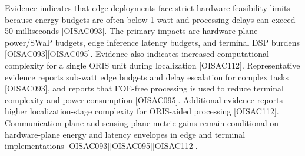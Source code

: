 {}
\markdownRendererSectionEnd \markdownRendererSectionBegin
{}\markdownRendererInterblockSeparator
{}\markdownRendererOlBegin
{} Evidence indicates that edge deployments face strict hardware feasibility limits because energy budgets are often below 1 watt and processing delays can exceed 50 milliseconds [O\markdownRendererUnderscore{}ISAC\markdownRendererUnderscore{}093].\markdownRendererOlItemEnd 
{} The primary impacts are hardware-plane power/SWaP budgets, edge inference latency budgets, and terminal DSP burdens [O\markdownRendererUnderscore{}ISAC\markdownRendererUnderscore{}093][O\markdownRendererUnderscore{}ISAC\markdownRendererUnderscore{}095]. Evidence also indicates increased computational complexity for a single ORIS unit during localization [O\markdownRendererUnderscore{}ISAC\markdownRendererUnderscore{}112].\markdownRendererOlItemEnd 
{} Representative evidence reports sub-watt edge budgets and delay escalation for complex tasks [O\markdownRendererUnderscore{}ISAC\markdownRendererUnderscore{}093], and reports that FOE-free processing is used to reduce terminal complexity and power consumption [O\markdownRendererUnderscore{}ISAC\markdownRendererUnderscore{}095]. Additional evidence reports higher localization-stage complexity for ORIS-aided processing [O\markdownRendererUnderscore{}ISAC\markdownRendererUnderscore{}112].\markdownRendererOlItemEnd 
{} Communication-plane and sensing-plane metric gains remain conditional on hardware-plane energy and latency envelopes in edge and terminal implementations [O\markdownRendererUnderscore{}ISAC\markdownRendererUnderscore{}093][O\markdownRendererUnderscore{}ISAC\markdownRendererUnderscore{}095][O\markdownRendererUnderscore{}ISAC\markdownRendererUnderscore{}112].\markdownRendererOlItemEnd 
